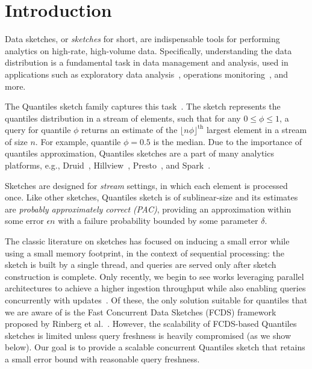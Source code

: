 \chapter{Introduction}
\label{chap:intro}

Data sketches, or \emph{sketches} for short, are indispensable tools for performing analytics on high-rate, high-volume data. Specifically, understanding the data distribution is a fundamental task in data management and analysis, used in applications such as exploratory data analysis~\cite{vartak2015seedb}, operations monitoring~\cite{abraham2013scuba}, and more. 

The Quantiles sketch family captures this task~\cite{masson2019ddsketch, mergeables_summaries, gan2018moment, cormode2021relative}. The sketch represents the quantiles distribution in a stream of elements, such that for any $0 \leq \phi \leq 1$, a query for quantile $\phi$ returns an estimate of the $\lfloor n\phi \rfloor ^{\text{th}}$ largest element in a stream of size $n$. For example, quantile $\phi=0.5$ is the median. Due to the importance of quantiles approximation, Quantiles sketches are a part of many analytics platforms, e.g., Druid~\cite{druid-quantiles}, Hillview~\cite{budiu2019hillview}, Presto~\cite{presto}, and Spark~\cite{spark}. 

Sketches are designed for \emph{stream} settings, in which each element is processed once. Like other sketches, Quantiles sketch is of sublinear-size and its estimates are \emph{probably approximately correct (PAC)}, providing an approximation within some error $\epsilon n$ with a failure probability bounded by some parameter $\delta$. 

The classic literature on sketches has focused on inducing a small error while using a small memory footprint, in the context of sequential processing: the sketch is built by a single thread, and queries are served only after sketch construction is complete. Only recently, we begin to see works leveraging parallel architectures to achieve a higher ingestion throughput while also enabling queries concurrently with updates~\cite{Rinberg_2020_fast_sketches, stylianopoulos2020delegation}. 
Of these, the only solution suitable for quantiles that we are aware of is the Fast Concurrent Data Sketches (FCDS) framework proposed by Rinberg et al.~\cite{Rinberg_2020_fast_sketches}. However, the scalability of FCDS-based Quantiles sketches is limited unless query freshness is heavily compromised (as we show below). Our goal is to provide a scalable concurrent Quantiles sketch that retains a small error bound with reasonable query freshness.


